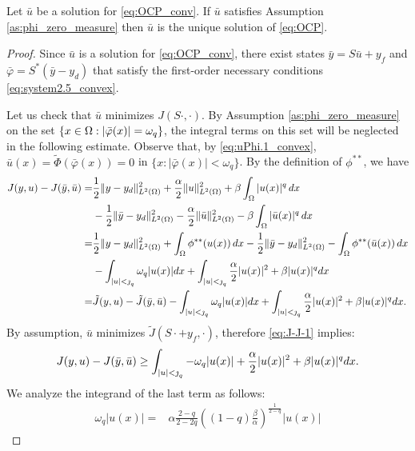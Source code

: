 \begin{theorem}\label{th:1} 
Let $\bar u$ be a solution for \eqref{eq:OCP_conv}. If $\bar u$ satisfies Assumption \ref{as:phi_zero_measure} then $\bar u$ is the unique solution of \eqref{eq:OCP}.
\end{theorem}
\begin{proof}
Since $\bar u$ is a solution for \eqref{eq:OCP_conv}, there exist states $\bar y = S \bar u + y_f$ and $\bar{\varphi} = S^*(\bar y -y_d) $ that satisfy the first-order necessary conditions \eqref{eq:system2.5_convex}. 

Let us check that $\bar u$ minimizes $J(S\cdot,\cdot)$. By Assumption \ref{as:phi_zero_measure} on the set $\{x\in \Omega : |\bar{\varphi}(x)|=\omega_q \}$, the integral terms on this set will be neglected in the following estimate. Observe that, by \eqref{eq:uPhi.1_convex}, $\bar u(x)=\tilde\Phi(\bar\varphi(x))=0$ in $\{x:|\bar{\varphi}(x)|<\omega_q\}$.  By the definition of $\phi^{**}$, we have		%
		\begin{align}
			J(y,u) - J(\bar y,\bar u)  = &\frac12\|y-y_d\|^2_{L^2(\Omega)} +\frac{\alpha}{2}\|u\|^2_{L^2(\Omega)} + \beta \int_{\Omega}|u(x)|^q\,dx  \nonumber \\
			&-\frac12\|\bar y-y_d\|^2_{L^2(\Omega)} -\frac{\alpha}{2}\|\bar u\|^2_{L^2(\Omega)} - \beta \int_{\Omega}|\bar u(x)|^q\,dx \nonumber \\
			=&\frac12\|y-y_d\|^2_{L^2(\Omega)} + \int_{\Omega}\phi^{**}(u(x))\,dx -\frac12\|\bar y-y_d\|^2_{L^2(\Omega)} -\int_{\Omega}\phi^{**}(\bar u(x))\,dx  \nonumber \\
			& -\int_{{|u|<\operatorname{\jmath}_q}} \omega_q |u(x)| dx + \int_{{|u|<\operatorname{\jmath}_q}} \frac{\alpha}{2}|u(x)|^2 + \beta |u(x)|^q  dx\nonumber\\
			=& \tilde J(y,u) - \tilde J(\bar y,\bar u) -\int_{{|u|<\operatorname{\jmath}_q}} \omega_q |u(x)| dx + \int_{{|u|<\operatorname{\jmath}_q}} \frac{\alpha}{2}|u(x)|^2 + \beta |u(x)|^q  dx. \label{eq:J-J-1}
		\end{align}
%
By assumption, $\bar u$ minimizes $\tilde J(S \cdot +y_f,\cdot)$, therefore \eqref{eq:J-J-1} implies: 
\begin{equation}
J(y,u) - J(\bar y,\bar u) \geq \int_{{|u|<\operatorname{\jmath}_q}} -\omega_q |u(x)|+\frac{\alpha}{2}|  u(x)|^2 + \beta |u(x)|^q  dx. \label{eq:J-J-1a}	
\end{equation}
%
We analyze the integrand of the last term as follows:
\begin{align}
	\omega_q|u(x)| = & \alpha \frac{2-q}{2-2q} ((1-q)\frac{\beta}{\alpha})^{\frac{1}{2-q}} |u(x)|

\end{align}
\end{proof}
